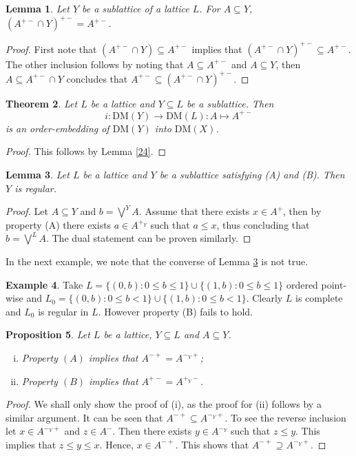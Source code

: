 \documentclass[12pt,a4paper]{amsart}
\numberwithin{equation}{section}
\newtheorem{thm}{Theorem}
\newtheorem{lem}[thm]{Lemma}
\newtheorem{prop}[thm]{Proposition}
\theoremstyle{definition}
\newtheorem{exmp}[thm]{Example}
\newcommand{\lattice}{L}
\newcommand{\lbigvee}[1]{\bigvee^{\scriptscriptstyle #1}}
\newcommand{\DM}{\text{DM}}
\begin{document}
\begin{lem}\label{25}
	Let $Y$ be a sublattice of a lattice $\lattice$.  For $A \subseteq Y$, $(A^{+-} \cap Y)^{+-} = A^{+-}$.
\end{lem}	
\begin{proof}
	First note that $(A^{+-} \cap Y) \subseteq A^{+-}$ implies that $(A^{+-} \cap Y)^{+-} \subseteq A^{+-}$. The other inclusion follows by noting that $A \subseteq A^{+-}$ and $A \subseteq Y$, then $A \subseteq A^{+-} \cap Y$ concludes that $A^{+-} \subseteq (A^{+-} \cap Y)^{+-}$.
\end{proof}	



\begin{thm}\label{28}
	Let $L$ be a lattice and $Y \subseteq L$ be a sublattice. Then 
	\[i:\DM(Y)\to\DM(L): A\mapsto A^{+-} \]
	is an order-embedding of $\DM(Y)$ into $\DM(X)$.  
\end{thm}	
\begin{proof}
 This follows by Lemma \ref{24}.
\end{proof}

	

\begin{lem}\label{lem21}
	Let $L$ be a lattice and $Y$ be a sublattice satisfying (A) and (B). Then $Y$ is regular.
\end{lem}
\begin{proof}
	Let $A \subseteq Y$ and $b = \lbigvee{Y} A$. Assume that there exists $x \in A^{+}$, then by property (A) there exists $a \in A^{+_Y}$ such that $a \leq x$, thus concluding that $b = \lbigvee{L} A$. The dual statement can be proven similarly. 
\end{proof}	

In the next example, we note that the converse of Lemma \ref{lem21} is not true. 

\begin{exmp} \label{exmp3}
    Take $L = \{(0,b) : 0 \leq b \leq 1\} \cup  \{(1,b) : 0 \leq b \leq 1\}$ ordered point-wise and $L_{0} = \{(0,b) : 0 \leq b < 1\} \cup  \{(1,b) : 0 \leq b < 1\}$. Clearly $L$ is complete and $L_{0}$ is regular in $L$. However property (B) fails to hold.
\end{exmp}

\begin{prop}\label{26}
	Let $L$ be a lattice, $Y \subseteq L$ and $A \subseteq Y$.
\begin{enumerate}[(i)]
	\item Property $(A)$ implies that $A^{-+} = A^{-_{Y}+}$;
	\item Property $(B)$ implies that $A^{+-} = A^{+_{Y}-}$.
\end{enumerate}
\end{prop}
\begin{proof}
	We shall only show the proof of (i), as the proof for (ii) follows by a similar argument. It can be seen that $A^{-+} \subseteq A^{-_{Y}+}$. To see the reverse inclusion let $x \in A^{-_{Y}+}$ and $z \in A^{-}$. Then there exists $y \in A^{-_{Y}}$ such that $z \leq y$. This implies that $z \leq y \leq x$.  Hence, $x \in A^{-+}$.  This shows that $A^{-+} \supseteq A^{-_{Y}+}$.
	\end{proof}
\end{document}
